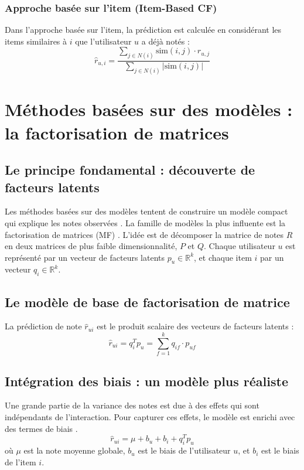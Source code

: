 \subsubsection{Approche basée sur l'item (Item-Based CF)}
Dans l'approche basée sur l'item, la prédiction est calculée en considérant les items similaires à $i$ que l'utilisateur $u$ a déjà notés \citep{Sarwar2001} :
\begin{equation}
\label{eq:item_pred_annexe}
\hat{r}_{u,i} = \frac{\sum_{j \in N(i)} \text{sim}(i, j) \cdot r_{u,j}}{\sum_{j \in N(i)} |\text{sim}(i, j)|}
\end{equation}

\section{Méthodes basées sur des modèles : la factorisation de matrices}

\subsection{Le principe fondamental : découverte de facteurs latents}
Les méthodes basées sur des modèles tentent de construire un modèle compact qui explique les notes observées \citep{Ricci2011}. La famille de modèles la plus influente est la factorisation de matrices (MF) \citep{Koren2009}. L'idée est de décomposer la matrice de notes $R$ en deux matrices de plus faible dimensionnalité, $P$ et $Q$. Chaque utilisateur $u$ est représenté par un vecteur de facteurs latents $p_u \in \mathbb{R}^k$, et chaque item $i$ par un vecteur $q_i \in \mathbb{R}^k$.

\subsection{Le modèle de base de factorisation de matrice}
La prédiction de note $\hat{r}_{ui}$ est le produit scalaire des vecteurs de facteurs latents :
\begin{equation}
\label{eq:mf_base_annexe}
\hat{r}_{ui} = q_i^T p_u = \sum_{f=1}^{k} q_{if} \cdot p_{uf}
\end{equation}

\subsection{Intégration des biais : un modèle plus réaliste}
Une grande partie de la variance des notes est due à des effets qui sont indépendants de l'interaction. Pour capturer ces effets, le modèle est enrichi avec des termes de biais \citep{Koren2009}.
\begin{equation}
\label{eq:mf_biais_annexe}
\hat{r}_{ui} = \mu + b_u + b_i + q_i^T p_u
\end{equation}
où $\mu$ est la note moyenne globale, $b_u$ est le biais de l'utilisateur $u$, et $b_i$ est le biais de l'item $i$.

